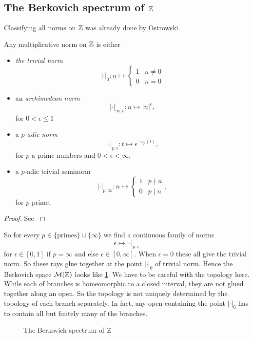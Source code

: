 \subsection{The Berkovich spectrum of $\mathbb{Z}$} \label{sec:the_berkovich_spectrum_of_z}
Classifying all norms on $\mathbb{Z}$ was already done by Ostrowski.
\begin{theorem}[Ostrowski]\label{thm:ostrowksi}
	Any multiplicative norm on $\mathbb{Z}$ is either
	\begin{itemize}
		\item \emph{the trivial norm} \[
				|\cdot |_0: n \mapsto \begin{cases}
					1 & n \ne 0 \\
					0 & n = 0
				\end{cases}
			\]
		\item an \emph{archimedean norm} \[
				|\cdot |_{\infty, \epsilon}: n \mapsto |n|^{\epsilon},
			\]
			for $0 <  \epsilon \le 1$
		\item a \emph{$p$-adic norm} \[
				|\cdot |_{p, \epsilon}: t \mapsto \epsilon ^{- v_p(t)},
			\]
			for $p$ a prime numbers and $0 < \epsilon < \infty$. 
		\item a $p$-adic trivial seminorm 
			\[
			|\cdot |_{p, \infty}: n \mapsto \begin{cases}
				1 & p \nmid n \\
				0 & p \mid n
			\end{cases}
			,\] 
			for $p$ prime. 
	\end{itemize}
\end{theorem}
\begin{proof}
	See \cite[thm.\ 1, p.\ 3]{koblitzPadicNumbersPadic1984}
\end{proof}
So for every $p \in \{\text{primes}\} \cup \{\infty\} $ we find a continuous family of norms \[
	\epsilon \mapsto|\cdot |_{p, \epsilon}
\] 
for $\epsilon \in [0, 1]$ if $p = \infty$ and else $\epsilon \in [0, \infty]$. 
When $\epsilon = 0$ these all give the trivial norm. 
So these rays glue together at the point $|\cdot |_0$ of trivial norm.
Hence the Berkovich space $\mathcal{M} (\mathbb{Z})$ looks like \cref{fig:berkovich-space-of-z}.
We have to be careful with the topology here.
While each of branches is homeomorphic to a closed interval, they are not glued together along an open.
So the topology is not uniquely determined by the topology of each branch separately.
In fact, any open containing the point $|\cdot |_0$ has to contain all but finitely many of the branches.

\begin{figure}[h]
    \centering
    \caption{The Berkovich spectrum of $\mathbb{Z}$}
    \label{fig:berkovich-space-of-z}
\end{figure}


